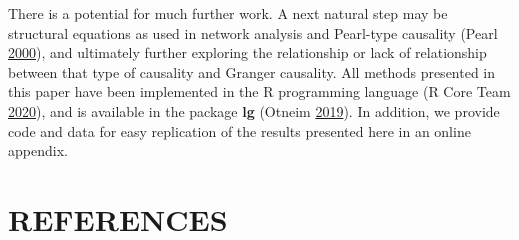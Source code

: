 \documentclass[
  12pt,
  letterpaper]{article}
\theoremstyle{definition}
\theoremstyle{definition}
\theoremstyle{definition}
\theoremstyle{remark}
\begin{document}
There is a potential for much further work. A next natural step may be structural equations as used in network analysis and Pearl-type causality (Pearl \protect\hyperlink{ref-pearl2000causality}{2000}), and ultimately further exploring the relationship or lack of relationship between that type of causality and Granger causality. All methods presented in this paper have been implemented in the R programming language (R Core Team \protect\hyperlink{ref-r}{2020}), and is available in the package \textbf{lg} (Otneim \protect\hyperlink{ref-otneim2019lg}{2019}). In addition, we provide code and data for easy replication of the results presented here in an online appendix.

\hypertarget{references}{%
\section*{REFERENCES}\label{references}}
\end{document}
